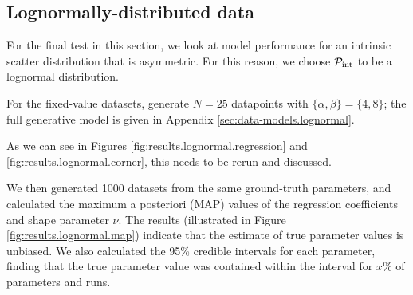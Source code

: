 \documentclass[fleqn,usenatbib]{mnras}
\begin{document}
\subsection{Lognormally-distributed data}
\label{sec:results.lognormal}

For the final test in this section, we look at model performance for an
intrinsic scatter distribution that is asymmetric. For this reason, we choose
$\mathcal P_{\rm int}$ to be a lognormal distribution.

For the fixed-value datasets, generate $N = 25$ datapoints with $\{\alpha,
\beta\} = \{4, 8\}$; the full generative model is given in Appendix
\ref{sec:data-models.lognormal}.



As we can see in Figures \ref{fig:results.lognormal.regression} and
\ref{fig:results.lognormal.corner}, {\color{red} this needs to be rerun and
discussed.}

We then generated 1000 datasets from the same ground-truth parameters, and
calculated the maximum a posteriori (MAP) values of the regression coefficients
and shape parameter $\nu$. The results (illustrated in Figure
\ref{fig:results.lognormal.map}) indicate that the estimate of true parameter values is
unbiased.{
\color{red} We also calculated the 95\% credible intervals for each parameter,
finding that the true parameter value was contained within the interval for
$x$\% of parameters and runs.
}

\end{document}
